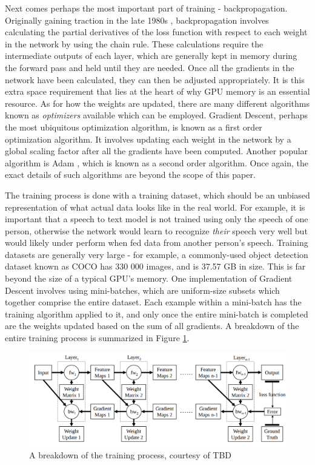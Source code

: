\documentclass[12pt,letterpaper]{article}
\begin{document}
Next comes perhaps the most important part of training - backpropagation. Originally gaining traction in the late 1980s \cite{hinton_backpropagation}, backpropagation involves calculating the partial derivatives of the loss function with respect to each weight in the network by using the chain rule. These calculations require the intermediate outputs of each layer, which are generally kept in memory during the forward pass and held until they are needed. Once all the gradients in the network have been calculated, they can then be adjusted appropriately. It is this extra space requirement that lies at the heart of why GPU memory is an essential resource. As for how the weights are updated, there are many different algorithms known as \textit{optimizers} available \cite{optimizers} which can be employed. Gradient Descent, perhaps the most ubiquitous optimization algorithm, is known as a first order optimization algorithm. It involves updating each weight in the network by a global scaling factor after all the gradients have been computed. Another popular algorithm is Adam \cite{adam}, which is known as a second order algorithm. Once again, the exact details of such algorithms are beyond the scope of this paper.
\par

The training process is done with a training dataset, which should be an unbiased representation of what actual data looks like in the real world. For example, it is important that a speech to text model is not trained using only the speech of one person, otherwise the network would learn to recognize \textit{their} speech very well but would likely under perform when fed data from another person's speech. Training datasets are generally very large - for example, a commonly-used object detection dataset known as COCO \cite{COCO} has 330 000 images, and is 37.57 GB in size. This is far beyond the size of a typical GPU's memory. One implementation of Gradient Descent involves using mini-batches, which are uniform-size subsets which together comprise the entire dataset. Each example within a mini-batch has the training algorithm applied to it, and only once the entire mini-batch is completed are the weights updated based on the sum of all gradients. A breakdown of the entire training process is summarized in Figure \ref{fig:training_memory_breakdown}.
\par

\begin{figure}[ht]
\centering
\includegraphics[width=1\textwidth]{training_memory_breakdown.png}
\captionsetup{width=0.7\linewidth}
\caption{A breakdown of the training process, courtesy of TBD \cite{tbd}}
\label{fig:training_memory_breakdown}
\end{figure}
\end{document}
